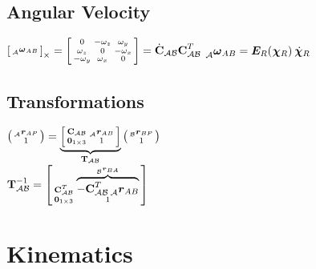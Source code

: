 \documentclass[a4paper, 8pt]{extarticle}
\newcommand{\mvec}[3]{  \prescript{}{\mathcal{#1}}{\bm{#2}}  _{#3} }
\newcommand{\mdvec}[3]{ \prescript{}{\mathcal{#1}}{\dot{\bm #2}} _{#3} }
\newcommand{\mrot}[2]{ \textbf{#1}_{ \mathcal{#2} } }
\begin{document}
\begin{multicols*}{3}
\subsection{Angular Velocity}
$\left[ \begin{smallmatrix}\mvec{A}{\omega}{AB}\end{smallmatrix} \right]_{\times} = \left[\begin{smallmatrix}
 0  & -\omega_z  &  \omega_y \\
 \omega_z  &  0  & -\omega_x \\
-\omega_y  &  \omega_x  &  0
\end{smallmatrix}\right] = \dot{\textbf C}_\mathcal{AB}\mrot{C}{AB}^T$
$\mvec{A}{\omega}{AB} = \bm{E}_R(\mvec{}{\chi}{R})\mdvec{}{\chi}{R}$


\subsection{Transformations}
$\left(\begin{smallmatrix} \mvec{A}{r}{AP} \\ 1\end{smallmatrix}\right) = 
\underbrace{\left[\begin{smallmatrix}
\mrot{C}{AB}  &  \mvec{A}{r}{AB} \\
\bm{0}_{1\times 3}  &  1 \end{smallmatrix}\right]}_{\mrot{T}{AB}}
\left(\begin{smallmatrix} \mvec{B}{r}{BP} \\ 1\end{smallmatrix}\right)$\\
$\mrot{T}{AB}^{-1} = \left[\begin{smallmatrix}
\mrot{C}{AB}^T  &  \overbrace{-\mrot{C}{AB}^T\mvec{A}{r}{AB}}^{\mvec{B}{r}{BA}} \\
\bm{0}_{1\times 3}  &  1 
\end{smallmatrix}\right]$



\section{Kinematics}

\end{multicols*}
\end{document}
